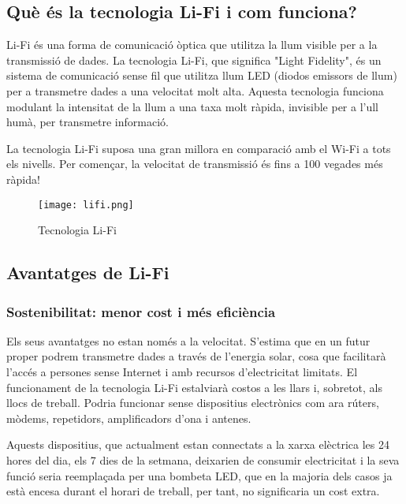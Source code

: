 
\subsection*{Què és la tecnologia Li-Fi i com funciona?}

Li-Fi és una forma de comunicació òptica que utilitza la llum visible per a la transmissió de dades. La tecnologia Li-Fi, que significa "Light Fidelity", és un sistema de comunicació sense fil que utilitza llum LED (diodos emissors de llum) per a transmetre dades a una velocitat molt alta. Aquesta tecnologia funciona modulant la intensitat de la llum a una taxa molt ràpida, invisible per a l'ull humà, per transmetre informació.

La tecnologia Li-Fi suposa una gran millora en comparació amb el Wi-Fi a tots els nivells. Per començar, la velocitat de transmissió és fins a 100 vegades més ràpida!

\begin{figure}[h!]
    \centering
    \texttt{[image: lifi.png]}
    \caption{Tecnologia Li-Fi}
    \label{fig:method}
\end{figure}


\subsection*{Avantatges de Li-Fi}

\subsubsection*{Sostenibilitat: menor cost i més eficiència}

Els seus avantatges no estan només a la velocitat. S'estima que en un futur proper podrem transmetre dades a través de l'energia solar, cosa que facilitarà l'accés a persones sense Internet i amb recursos d'electricitat limitats. El funcionament de la tecnologia Li-Fi estalviarà costos a les llars i, sobretot, als llocs de treball. Podria funcionar sense dispositius electrònics com ara rúters, mòdems, repetidors, amplificadors d'ona i antenes.

Aquests dispositius, que actualment estan connectats a la xarxa elèctrica les 24 hores del dia, els 7 dies de la setmana, deixarien de consumir electricitat i la seva funció seria reemplaçada per una bombeta LED, que en la majoria dels casos ja està encesa durant el horari de treball, per tant, no significaria un cost extra.


